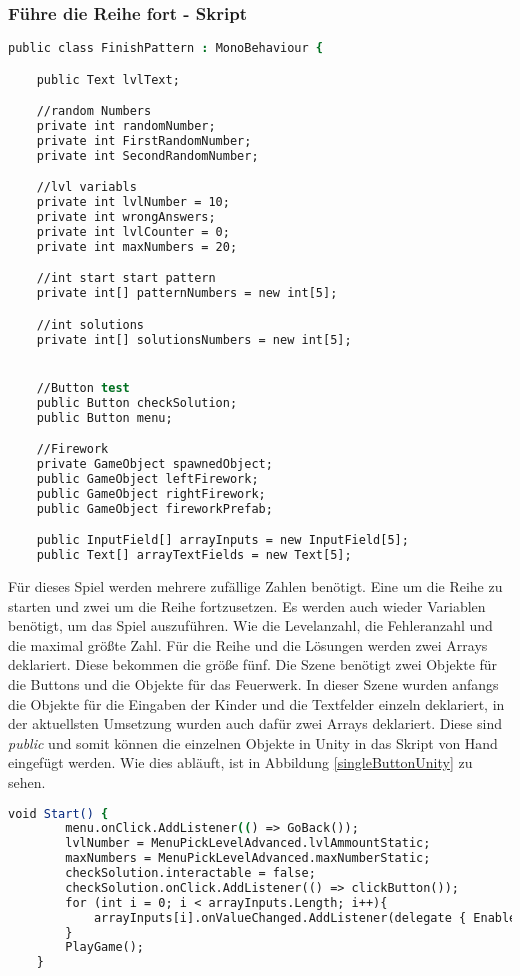 \subsubsection{Führe die Reihe fort - Skript}
\begin{lstlisting}[language=csh, caption={hideCircle.cs Variablendeklaration}]
public class FinishPattern : MonoBehaviour {

	public Text lvlText;

	//random Numbers
	private int randomNumber;
	private int FirstRandomNumber;
	private int SecondRandomNumber;

	//lvl variabls
	private int lvlNumber = 10;
	private int wrongAnswers;
	private int lvlCounter = 0;
	private int maxNumbers = 20;

	//int start start pattern
	private int[] patternNumbers = new int[5];

	//int solutions
	private int[] solutionsNumbers = new int[5];


	//Button test
	public Button checkSolution;
	public Button menu;

	//Firework
	private GameObject spawnedObject;
	public GameObject leftFirework;
	public GameObject rightFirework;
	public GameObject fireworkPrefab;

	public InputField[] arrayInputs = new InputField[5];
	public Text[] arrayTextFields = new Text[5];
\end{lstlisting}
Für dieses Spiel werden mehrere zufällige Zahlen benötigt. Eine um die Reihe zu starten und zwei um die Reihe fortzusetzen.  Es werden auch wieder Variablen benötigt, um das Spiel auszuführen. Wie die Levelanzahl, die Fehleranzahl und die maximal größte Zahl. Für die Reihe und die Lösungen werden zwei Arrays deklariert. Diese bekommen die größe fünf. Die Szene benötigt zwei Objekte für die Buttons und die Objekte für das Feuerwerk. In dieser Szene wurden anfangs die Objekte für die Eingaben der Kinder und die Textfelder einzeln deklariert, in der aktuellsten Umsetzung wurden auch dafür zwei Arrays deklariert. Diese sind \textit{public} und somit können die einzelnen Objekte in Unity in das Skript von Hand eingefügt werden. Wie dies abläuft, ist in Abbildung \ref{singleButtonUnity} zu sehen.\\
\begin{lstlisting}[language=csh, caption={hideCircle.cs Start-Funktion}]
	void Start() {
		menu.onClick.AddListener(() => GoBack());
		lvlNumber = MenuPickLevelAdvanced.lvlAmmountStatic;
		maxNumbers = MenuPickLevelAdvanced.maxNumberStatic;
		checkSolution.interactable = false;
		checkSolution.onClick.AddListener(() => clickButton());
		for (int i = 0; i < arrayInputs.Length; i++){
			arrayInputs[i].onValueChanged.AddListener(delegate { EnableButton(); });
		}
		PlayGame();
	}
\end{lstlisting}
